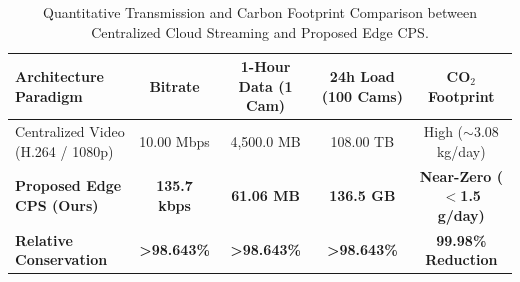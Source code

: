 
\begin{table}[htbp]
\centering
\caption{Quantitative Transmission and Carbon Footprint Comparison between Centralized Cloud Streaming and Proposed Edge CPS.}
\label{tab:edge_efficiency}
\begin{tabular}{lcccc}
\hline
\textbf{Architecture Paradigm} & \textbf{Bitrate} & \textbf{1-Hour Data (1 Cam)} & \textbf{24h Load (100 Cams)} & \textbf{CO$_2$ Footprint} \\ \hline
Centralized Video (H.264 / 1080p) & 10.00 Mbps & 4,500.0 MB & 108.00 TB & High ($\sim$3.08 kg/day) \\
\textbf{Proposed Edge CPS (Ours)} & \textbf{135.7 kbps} & \textbf{61.06 MB} & \textbf{136.5 GB} & \textbf{Near-Zero ($<$1.5 g/day)} \\ \hline
\textbf{Relative Conservation} & \textbf{>98.643\%} & \textbf{>98.643\%} & \textbf{>98.643\%} & \textbf{99.98\% Reduction} \\ \hline
\end{tabular}
\end{table}
